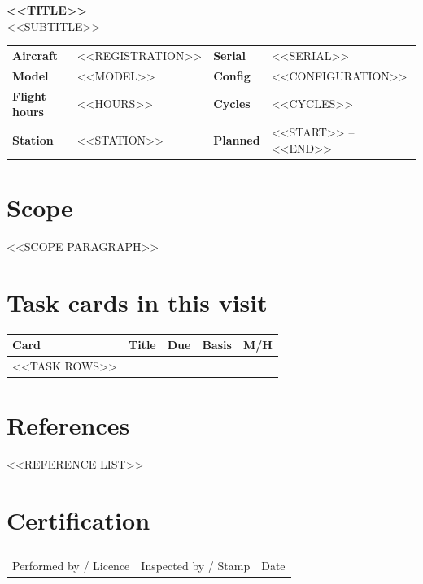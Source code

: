 \documentclass[11pt,a4paper]{article}
\begin{document}
\begin{center}
  {\LARGE\bfseries <<TITLE>>}\\[4pt]
  {\large <<SUBTITLE>>}
\end{center}
\vspace{4mm}

\begin{tabularx}{\textwidth}{@{}l X l X@{}}
  \toprule
  \textbf{Aircraft}    & <<REGISTRATION>> & \textbf{Serial}   & <<SERIAL>> \\
  \textbf{Model}       & <<MODEL>>        & \textbf{Config}   & <<CONFIGURATION>> \\
  \textbf{Flight hours}& <<HOURS>>        & \textbf{Cycles}   & <<CYCLES>> \\
  \textbf{Station}     & <<STATION>>      & \textbf{Planned}  & <<START>> -- <<END>> \\
  \bottomrule
\end{tabularx}

\section*{Scope}
<<SCOPE PARAGRAPH>>

\section*{Task cards in this visit}
\begin{longtable}{@{}l p{62mm} l l r@{}}
  \toprule
  \textbf{Card} & \textbf{Title} & \textbf{Due} & \textbf{Basis} & \textbf{M/H} \\
  \midrule
  \endhead
  <<TASK ROWS>>
  \bottomrule
\end{longtable}

\section*{References}
<<REFERENCE LIST>>

\section*{Certification}
\vspace{10mm}
\begin{tabularx}{\textwidth}{@{}X X X@{}}
  \hrulefill & \hrulefill & \hrulefill \\
  Performed by / Licence & Inspected by / Stamp & Date \\
\end{tabularx}
\end{document}

